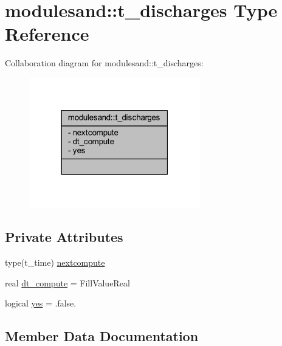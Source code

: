 \hypertarget{structmodulesand_1_1t__discharges}{}\section{modulesand\+:\+:t\+\_\+discharges Type Reference}
\label{structmodulesand_1_1t__discharges}


Collaboration diagram for modulesand\+:\+:t\+\_\+discharges\+:\nopagebreak
\begin{figure}[H]
\begin{center}
\leavevmode
\includegraphics[width=211pt]{structmodulesand_1_1t__discharges__coll__graph}
\end{center}
\end{figure}
\subsection*{Private Attributes}
\begin{DoxyCompactItemize}
\item 
type(t\+\_\+time) \mbox{\hyperlink{structmodulesand_1_1t__discharges_acc5aea8e899e04f1343585d0e9e128bd}{nextcompute}}
\item 
real \mbox{\hyperlink{structmodulesand_1_1t__discharges_a75c4ee5e10cc0f6a3e0a5871cfe25bac}{dt\+\_\+compute}} = Fill\+Value\+Real
\item 
logical \mbox{\hyperlink{structmodulesand_1_1t__discharges_a35ef496665f200306b5a50f2c80f2248}{yes}} = .false.
\end{DoxyCompactItemize}


\subsection{Member Data Documentation}
\mbox{\label{structmodulesand_1_1t__discharges_a75c4ee5e10cc0f6a3e0a5871cfe25bac}} 
